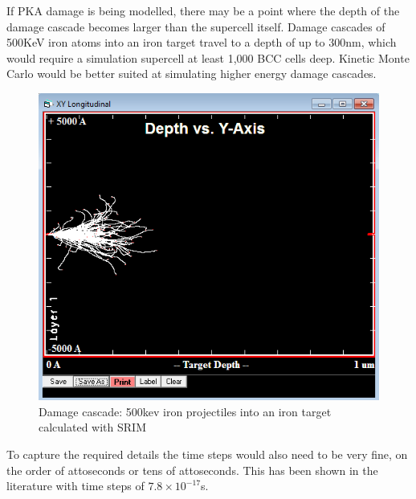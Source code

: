 If PKA damage is being modelled, there may be a point where the depth of the damage cascade becomes larger than the supercell itself.  Damage cascades of 500KeV iron atoms into an iron target travel to a depth of up to 300nm, which would require a simulation supercell at least 1,000 BCC cells deep.  Kinetic Monte Carlo would be better suited at simulating higher energy damage cascades.   

\begin{figure}[h]
  \begin{center}
    \includegraphics[width=.6\linewidth]{chapters/interatomic_potential_fitting/plots/fe500kev.png}
    \caption{Damage cascade: 500kev iron projectiles into an iron target calculated with SRIM}
    \label{graph:fe500kev}
  \end{center}
\end{figure}

To capture the required details the time steps would also need to be very fine, on the order of attoseconds or tens of attoseconds.  This has been shown in the literature with time steps of $7.8 \times 10^{-17}$s\cite{moxlammpsdamage}.

















